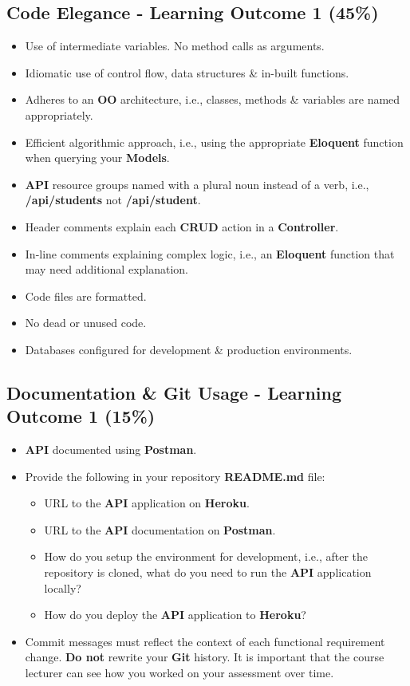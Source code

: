 \documentclass{article}
\begin{document}
\subsection*{Code Elegance - Learning Outcome 1 (45\%)}
\begin{itemize}
	\item Use of intermediate variables. No method calls as arguments.
	\item Idiomatic use of control flow, data structures \& in-built functions.
	\item Adheres to an \textbf{OO} architecture, i.e., classes, methods \& variables are named appropriately.
	\item Efficient algorithmic approach, i.e., using the appropriate \textbf{Eloquent} function when querying your \textbf{Models}.
	\item \textbf{API} resource groups named with a plural noun instead of a verb, i.e., \textbf{/api/students} not \textbf{/api/student}.
	\item Header comments explain each \textbf{CRUD} action in a \textbf{Controller}.
	\item In-line comments explaining complex logic, i.e., an \textbf{Eloquent} function that may need additional explanation.
	\item Code files are formatted.
	\item No dead or unused code.
	\item Databases configured for development \& production environments.
\end{itemize} 

\subsection*{Documentation \& Git Usage - Learning Outcome 1 (15\%)}
\begin{itemize}
  \item \textbf{API} documented using \textbf{Postman}.
	\item Provide the following in your repository \textbf{README.md} file:
	      \begin{itemize}
		      \item URL to the \textbf{API} application on \textbf{Heroku}.
		      \item URL to the \textbf{API} documentation on \textbf{Postman}.
		      \item How do you setup the environment for development, i.e., after the repository is cloned, what do you need to run the \textbf{API} application locally?
					\item How do you deploy the \textbf{API} application to \textbf{Heroku}?
	      \end{itemize}
			\end{itemize}
			\begin{itemize}
	\item Commit messages must reflect the context of each functional requirement change. \textbf{Do not} rewrite your \textbf{Git} history. It is important that the course lecturer can see how you worked on your assessment over time.
\end{itemize}
\end{document}
